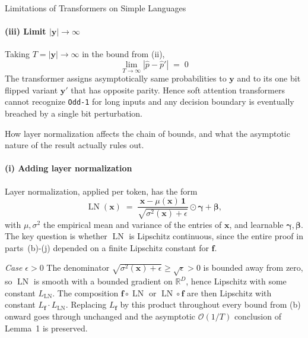 \begin{question}{Limitations of Transformers on Simple Languages}
\begin{subquestion}
    \paragraph{(iii) Limit $|\mathbf{y}| \to \infty$}
    Taking $T = |\mathbf{y}| \to \infty$ in the bound from (ii),
    \begin{equation*}
        \lim_{T \to \infty} |\hat{p} - \hat{p}'| \;=\; 0
    \end{equation*}
    The transformer assigns asymptotically same probabilities to $\mathbf{y}$ and to its one bit flipped variant $\mathbf{y}'$ that has opposite parity. 
    Hence soft attention transformers cannot recognize \texttt{Odd-1} for long inputs and any decision boundary is eventually breached by a single bit perturbation.
\end{subquestion}

\begin{subquestion}
    How layer normalization affects the chain of bounds, and what the asymptotic nature of the result actually rules out.

    \paragraph{(i) Adding layer normalization}
    Layer normalization, applied per token, has the form
    \begin{equation*}
        \operatorname{LN}(\mathbf{x}) \;=\; \frac{\mathbf{x} - \mu(\mathbf{x})\,\mathbf{1}}{\sqrt{\sigma^{2}(\mathbf{x}) + \epsilon}} \odot \boldsymbol{\gamma} + \boldsymbol{\beta},
    \end{equation*}
    with $\mu, \sigma^{2}$ the empirical mean and variance of the entries of $\mathbf{x}$, and learnable $\boldsymbol{\gamma}, \boldsymbol{\beta}$. 
    The key question is whether $\operatorname{LN}$ is Lipschitz continuous, since the entire proof in parts~(b)-(j) depended on a finite Lipschitz constant for $\mathbf{f}$.

    \emph{Case $\epsilon > 0$} 
    The denominator $\sqrt{\sigma^{2}(\mathbf{x}) + \epsilon} \ge \sqrt{\epsilon} > 0$ is bounded away from zero, so $\operatorname{LN}$ is smooth with a bounded gradient on $\mathbb{R}^{D}$, hence Lipschitz with some constant $L_{\operatorname{LN}}$. 
    The composition $\mathbf{f} \circ \operatorname{LN}$ or $\operatorname{LN} \circ \mathbf{f}$ are then Lipschitz with constant $L_{\mathbf{f}} \cdot L_{\operatorname{LN}}$. 
    Replacing $L_{\mathbf{f}}$ by this product throughout every bound from (b) onward goes through unchanged and the asymptotic $\mathcal{O}(1/T)$ conclusion of Lemma~1 is preserved.


\end{subquestion}
\end{question}

